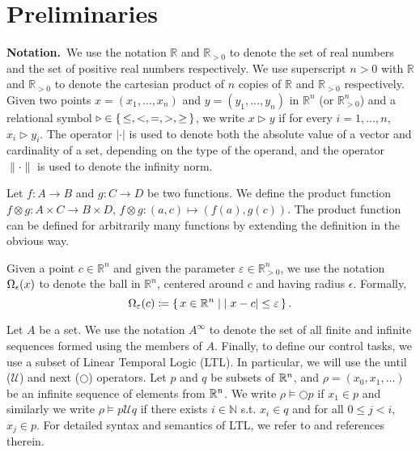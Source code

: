 
\section{Preliminaries}

\smallskip
\noindent\textbf{Notation.}\
We use the notation $\mathbb{R}$ and $\mathbb{R}_{>0}$ to denote the set of real numbers and the set of positive real numbers respectively.
We use superscript $n>0$ with $\mathbb{R}$ and $\mathbb{R}_{>0}$ to denote the cartesian product of $n$ copies of $\mathbb{R}$ and $\mathbb{R}_{>0}$ respectively.
Given two points $x=(x_1,\ldots, x_n)$ and $y=(y_1,\ldots, y_n)$ in $ \mathbb{R}^n$ (or $\mathbb{R}^n_{>0}$) and a relational symbol $\triangleright\in \set{\leq, <, = , >, \geq}$, we write $x\triangleright y$ if for every $i=1,\ldots,n$, $x_i\triangleright y_i$.
The operator $|\cdot |$ is used to denote both the absolute value of a vector and cardinality of a set, depending on the type of the operand, and the operator $\| \cdot \|$ is used to denote the infinity norm.  

Let $f\colon A\to B$ and $g\colon C\to D$ be two functions.
We define the product function $f\otimes g\colon A\times C\to B\times D $, $f\otimes g \colon (a,c)\mapsto (f(a),g(c))$.
The product function can be defined for arbitrarily many functions by extending the definition in the obvious way.

Given a point $c\in \mathbb{R}^n$ and given the parameter $\varepsilon\in \mathbb{R}_{>0}^{n}$, we use the notation $\Omega_\epsilon( x)$ to denote the ball in $\mathbb{R}^n$, centered around $c$ and having radius $\epsilon$.
Formally, \[\Omega_\varepsilon(c)\coloneqq \set{x
	\in \mathbb{R}^n \mid  |x-c|\leq \varepsilon }.\] 

Let $A$ be a set.
We use the notation $A^\infty$ to denote the set of all finite and infinite sequences formed using the members of $A$. Finally, to define our control tasks, we use a subset of Linear Temporal Logic (LTL). In particular, we will use the until ($\mathcal{U}$) and next  ($\bigcirc$) operators. Let $p$ and $q$ be subsets of $\mathbb{R}^n$, and $\rho=(x_0,x_1,\dots)$ be an infinite sequence of elements from $\mathbb{R}^n$. We write $\rho\models\bigcirc p$ if $x_1\in p$ and similarly we write $\rho\models p\mathcal{U}q$ if there exists $i\in\mathbb{N}$ s.t. $x_i\in q$ and for all $0\leq j<i$, $x_j\in p$. For detailed syntax and semantics of LTL, we refer to \cite{baier2008principles} and references therein.

